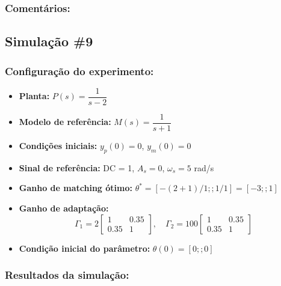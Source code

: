 \documentclass[10pt]{article}
\begin{document}
\subsubsection{Comentários:}

\subsection{Simulação \#9}
\subsubsection{Configuração do experimento:}
\begin{itemize}
\item \textbf{Planta:} $P(s) = \dfrac{1}{s - 2}$
\item \textbf{Modelo de referência:} $M(s) = \dfrac{1}{s + 1}$
\item \textbf{Condições iniciais:} $y_p(0)=0$, $y_m(0)=0$
\item \textbf{Sinal de referência:} DC = 1, $A_s=0$, $\omega_s=5$ rad/s
\item \textbf{Ganho de matching ótimo:} $\theta^* = [-(2+1)/1;;1/1] = [-3;;1]$
\item \textbf{Ganho de adaptação:} 
\[
\Gamma_1 = 2 \begin{bmatrix} 1 & 0.35 \\ 0.35 & 1 \end{bmatrix}, \quad
\Gamma_2 = 100 \begin{bmatrix} 1 & 0.35 \\ 0.35 & 1 \end{bmatrix}
\]
\item \textbf{Condição inicial do parâmetro:} $\theta(0) = [0;;0]$
\end{itemize}

\subsubsection{Resultados da simulação:}
\end{document}
